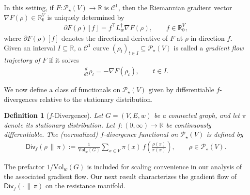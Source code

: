 \documentclass[11pt,a4paper]{article}
\newcommand{\Div}{\mathsf{Div}}
\newcommand{\Prob}{\mathscr{P}}
\newcommand{\Vol}{\mathrm{Vol}}
\newtheorem{definition}[theorem]{Definition}
\begin{document}
In this setting, if $F:\Prob_\star(V)\to\mathbb{R}$ is $\mathcal{C}^{1}$, then the Riemannian gradient vector $\nabla F(\rho)\in\mathbb{R}^V_0$ is uniquely determined by
    \begin{align*}
        \partial F(\rho)[f] = f^\top L_w^\dagger \nabla F(\rho),\qquad f\in\mathbb{R}^V_0,
    \end{align*}
where $\partial F(\rho)[f]$ denotes the directional derivative of $F$ at $\rho$ in direction $f$. Given an interval $I\subseteq\mathbb{R}$, a $\mathcal{C}^{1}$ curve $(\rho_t)_{t\in I}\subseteq\Prob_\star(V)$ is called a \emph{gradient flow trajectory of $F$} if it solves
    \begin{align*}
        \frac{d}{dt}\rho_t = -\nabla F(\rho_t),\qquad t\in I.
    \end{align*}

We now define a class of functionals on $\Prob_\star(V)$ given by differentiable $f$-divergences relative to the stationary distribution.

\begin{definition}[$f$-Divergence]\label{defn:f-divergence}
    Let $G=(V,E,w)$ be a connected graph, and let $\pi$ denote its stationary distribution. Let $f:(0,\infty)\to\mathbb{R}$ be continuously differentiable. The (normalized) \emph{$f$-divergence functional} on $\Prob_\star(V)$ is defined by
        \begin{align}\label{eq:f-divergence-functional}
            \Div_f(\rho\,\|\,\pi)
            := \frac{1}{\Vol_w(G)}\sum_{x\in V} \pi(x)\, f\!\left(\frac{\rho(x)}{\pi(x)}\right),
            \qquad \rho\in\Prob_\star(V).
        \end{align}
\end{definition}

The prefactor $1/\Vol_w(G)$ is included for scaling convenience in our analysis of the associated gradient flow. Our next result characterizes the gradient flow of $\Div_f(\cdot\,\|\,\pi)$ on the resistance manifold.
\end{document}
